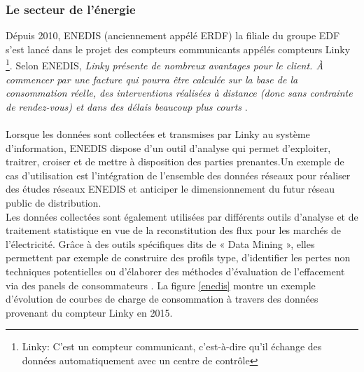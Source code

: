 \documentclass[11pt,a4paper]{report}
\begin{document}
%
%

\subsubsection{Le secteur de l'énergie}

Dépuis 2010, ENEDIS (anciennement appélé ERDF) la filiale du groupe EDF s'est lancé dans le projet des compteurs communicants appélés compteurs Linky \footnote{Linky: C'est un compteur communicant, c'est-à-dire qu'il échange des données automatiquement avec un centre de contrôle}. Selon ENEDIS, \textit{Linky présente de nombreux avantages pour le client. À commencer par une facture qui pourra être calculée sur la base de la consommation réelle, des interventions réalisées à distance (donc sans contrainte de rendez-vous) et dans des délais beaucoup plus courts} \cite{linky}.\\\\

Lorsque les données sont collectées et transmises par Linky au système d'information, ENEDIS dispose d'un outil d'analyse qui permet d'exploiter, traitrer, croiser et de mettre à disposition des parties prenantes.Un exemple de cas d'utilisation est l'intégration de l'ensemble des données réseaux pour réaliser des études réseaux ENEDIS et anticiper le dimensionnement du futur réseau public de distribution. \\
Les données collectées sont également utilisées par différents outils d’analyse et de traitement statistique en vue de la reconstitution des flux pour les marchés de l’électricité. Grâce à des outils spécifiques dits de « Data Mining », elles permettent par exemple de construire des profils type, d’identifier les pertes non techniques potentielles ou d’élaborer des méthodes d’évaluation de l’effacement via des panels de consommateurs \cite{linky2}. La figure \ref{enedis} montre un exemple d'évolution de courbes de charge de consommation à travers des données provenant du compteur Linky en 2015. 
\end{document}

